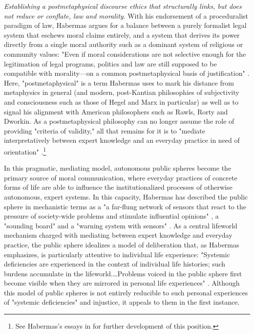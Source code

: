 \emph{Establishing a postmetaphysical discourse ethics that structurally links, but does not reduce or conflate, law and morality}. With his endorsement of a proceduralist paradigm of law, Habermas argues for a balance between a purely formalist legal system that eschews moral claims entirely, and a system that derives its power directly from a single moral authority such as a dominant system of religious or community values: "Even if moral considerations are not selective enough for the legitimation of legal programs, politics and law are still supposed to be compatible with morality---on a common postmetaphysical basis of justification" \autocite[453]{Habermas-bfn}. Here, "postmetaphysical" is a term Habermas uses to mark his distance from metaphysics in general (and modern, post-Kantian philosophies of subjectivity and consciousness such as those of Hegel and Marx in particular) as well as to signal his alignment with American philosophers such as Rawls, Rorty and Dworkin. As a postmetaphysical philosophy can no longer assume the role of providing "criteria of validity," all that remains for it is to "mediate interpretatively between expert knowledge and an everyday practice in need of orientation" \autocite[17]{Habermas1992}.\footnote{ See Habermas's essays in  for further development of this position.}

In this pragmatic, mediating model, autonomous public spheres become the primary source of moral communication, where everyday practices of concrete forms of life are able to influence the institutionalized processes of otherwise autonomous, expert systems. In this capacity, Habermas has described the public sphere in mechanistic terms as a "a far-flung network of sensors that react to the pressure of society-wide problems and stimulate influential opinions" \autocite[300]{Habermas-bfn}, a "sounding board" and a "warning system with sensors" \autocite[359]{Habermas-bfn}. As a central lifeworld mechanism charged with mediating between expert knowledge and everyday practice, the public sphere idealizes a model of deliberation that, as Habermas emphasizes, is particularly attentive to individual life experience: "Systemic deficiencies are experienced in the context of individual life histories; such burdens accumulate in the lifeworld.…Problems voiced in the public sphere first become visible when they are mirrored in personal life experiences" \autocite[365]{Habermas-bfn}. Although this model of public spheres is not entirely reducible to such personal experiences of "systemic deficiencies" and injustice, it appeals to them in the first instance.

